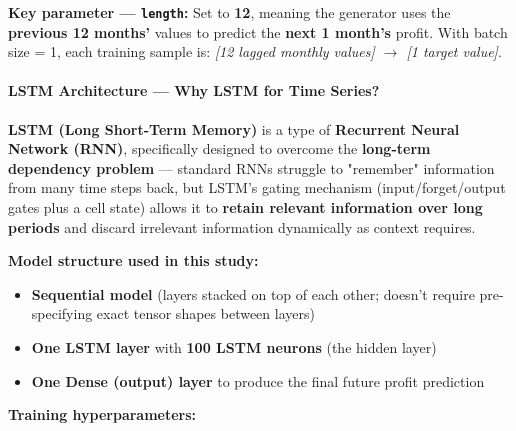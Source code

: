 \documentclass[12pt,openany]{book}
\begin{document}
\textbf{Key parameter --- \texttt{length}:} Set to \textbf{12}, meaning the generator uses the \textbf{previous 12 months'} values to predict the \textbf{next 1 month's} profit. With batch size = 1, each training sample is: \textit{[12 lagged monthly values] \(\rightarrow\) [1 target value]}.

\paragraph{LSTM Architecture --- Why LSTM for Time Series?}

\textbf{LSTM (Long Short-Term Memory)} is a type of \textbf{Recurrent Neural Network (RNN)}, specifically designed to overcome the \textbf{long-term dependency problem} --- standard RNNs struggle to "remember" information from many time steps back, but LSTM's gating mechanism (input/forget/output gates plus a cell state) allows it to \textbf{retain relevant information over long periods} and discard irrelevant information dynamically as context requires.

\textbf{Model structure used in this study:}
\begin{itemize}[leftmargin=*]
    \item \textbf{Sequential model} (layers stacked on top of each other; doesn't require pre-specifying exact tensor shapes between layers)
    \item \textbf{One LSTM layer} with \textbf{100 LSTM neurons} (the hidden layer)
    \item \textbf{One Dense (output) layer} to produce the final future profit prediction
\end{itemize}

\textbf{Training hyperparameters:}
\end{document}
